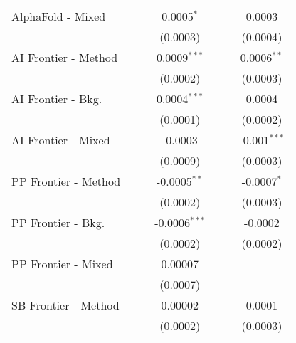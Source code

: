\begin{tabular}{lcccccc}
   AlphaFold - Mixed    &               &                & 0.0005$^{*}$    &               &                & 0.0003\\   
                        &               &                & (0.0003)        &               &                & (0.0004)\\   
   AI Frontier - Method &               &                & 0.0009$^{***}$  &               &                & 0.0006$^{**}$\\   
                        &               &                & (0.0002)        &               &                & (0.0003)\\   
   AI Frontier - Bkg.   &               &                & 0.0004$^{***}$  &               &                & 0.0004\\   
                        &               &                & (0.0001)        &               &                & (0.0002)\\   
   AI Frontier - Mixed  &               &                & -0.0003         &               &                & -0.001$^{***}$\\   
                        &               &                & (0.0009)        &               &                & (0.0003)\\   
   PP Frontier - Method &               &                & -0.0005$^{**}$  &               &                & -0.0007$^{*}$\\   
                        &               &                & (0.0002)        &               &                & (0.0003)\\   
   PP Frontier - Bkg.   &               &                & -0.0006$^{***}$ &               &                & -0.0002\\   
                        &               &                & (0.0002)        &               &                & (0.0002)\\   
   PP Frontier - Mixed  &               &                & 0.00007         &               &                &   \\   
                        &               &                & (0.0007)        &               &                &   \\   
   SB Frontier - Method &               &                & 0.00002         &               &                & 0.0001\\   
                        &               &                & (0.0002)        &               &                & (0.0003)\\   

\end{tabular}
